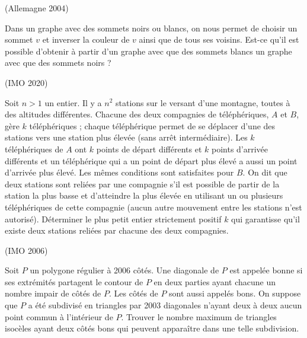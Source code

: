 \begin{exo}
(Allemagne 2004) 

Dans un graphe avec des sommets noirs ou blancs, on nous permet de choisir un sommet $v$ et inverser la couleur de $v$ ainsi que de tous ses voisins. Est-ce qu’il est possible d’obtenir à partir d’un graphe avec que des sommets blancs un graphe avec que des sommets noirs ?\\

\end{exo}


\begin{exo}

(IMO 2020)

Soit $n > 1$ un entier. Il y a $n^2$ stations sur le versant d’une montagne, toutes à des altitudes différentes. Chacune des deux compagnies de téléphériques, $A$ et $B$, gère $k$ téléphériques ; chaque téléphérique permet de se déplacer d’une des stations vers une station plus élevée (sans arrêt intermédiaire). Les $k$ téléphériques de $A$ ont $k$ points de départ différents et $k$ points d’arrivée différents et un téléphérique qui a un point de départ plus élevé a aussi un point d’arrivée plus élevé. Les mêmes conditions sont satisfaites pour $B$. On dit que deux stations sont reliées par une compagnie s’il est possible de partir de la station la plus basse et d’atteindre la plus élevée en utilisant un ou plusieurs téléphériques de cette compagnie (aucun autre mouvement entre les stations n’est autorisé). Déterminer le plus petit entier strictement positif $ k$ qui garantisse qu’il existe deux stations reliées par chacune des deux compagnies. 

\end{exo}



\begin{exo}
(IMO 2006) 

 Soit $P$ un polygone régulier à 2006 côtés. Une diagonale de $P$ est appelée bonne si ses extrémités partagent le contour de $P$ en deux parties ayant chacune un nombre impair de côtés de $P$. Les côtés de $P$ sont aussi appelés bons. On suppose que $P$ a été subdivisé en triangles par 2003 diagonales n’ayant deux à deux aucun point commun à l’intérieur de $P$. Trouver le nombre maximum de triangles isocèles ayant deux côtés bons qui peuvent apparaître dans une telle subdivision. 
 
\end{exo}
 
